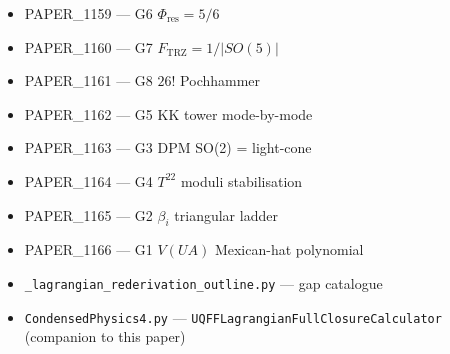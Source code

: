 \documentclass[
]{article}
\providecommand{\tightlist}{%
  \setlength{\itemsep}{0pt}\setlength{\parskip}{0pt}}
\begin{document}
\begin{itemize}
\tightlist
\item
  PAPER\_1159 --- G6 \(\Phi_{\mathrm{res}} = 5/6\)
\item
  PAPER\_1160 --- G7 \(F_{\mathrm{TRZ}} = 1/|SO(5)|\)
\item
  PAPER\_1161 --- G8 \(26!\) Pochhammer
\item
  PAPER\_1162 --- G5 KK tower mode-by-mode
\item
  PAPER\_1163 --- G3 DPM SO(2) = light-cone
\item
  PAPER\_1164 --- G4 \(T^{22}\) moduli stabilisation
\item
  PAPER\_1165 --- G2 \(\beta_i\) triangular ladder
\item
  PAPER\_1166 --- G1 \(V(UA)\) Mexican-hat polynomial
\item
  \texttt{\_lagrangian\_rederivation\_outline.py} --- gap catalogue
\item
  \texttt{CondensedPhysics4.py} ---
  \texttt{UQFFLagrangianFullClosureCalculator} (companion to this paper)
\end{itemize}




\end{document}
